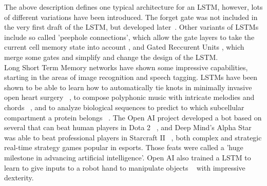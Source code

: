 \documentclass[
	a4paper,
	pagesize,
	pdftex,
	12pt,
	twoside, %
	BCOR=5mm, %
	ngerman,
	fleqn,
	final,
	]{scrartcl}
\begin{document}
The above description defines one typical architecture for an LSTM, however, lots of different variations have been introduced. The forget gate was not included in the very first draft of the LSTM, but developed later~\cite{Gers.1999}. Other variants of LSTMs include so called 'peephole connections', which allow the gate layers to take the current cell memory state into account \cite{Gers.2000}, and Gated Reccurent Units \cite{Cho.2014}, which merge some gates and simplify and change the design of the LSTM. \\
Long Short Term Memory networks have shown some impressive capabilities, starting in the areas of image recognition and speech tagging. LSTMs have been shown to be able to learn how to automatically tie knots in minimally invasive open heart surgery ~\cite{Mayer.2008}, to compose polyphonic music with intricate melodies and chords ~\cite{Kumar.2019}, and to analyze biological sequences to predict to which subcellular compartment a protein belongs ~\cite{Snderby.2015}. The Open AI project developed a bot based on several that can beat human players in Dota 2 ~\cite{Rodriguez.2018}, and Deep Mind's Alpha Star was able to beat professional players in Starcraft II ~\cite{Stanford.2019}, both complex and strategic real-time strategy games popular in esports. Those feats were called a 'huge milestone in advancing artificial intelligence'. Open AI also trained a LSTM to learn to give inputs to a robot hand to manipulate objects ~\cite{OpenAIBlog.2018} with impressive dexterity.
\end{document}
